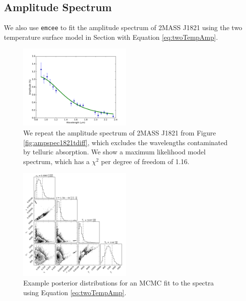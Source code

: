 \documentclass[twocolumn]{aastex6}
\begin{document}
\clearpage
\pagebreak
\subsection{Amplitude Spectrum}

We also use \texttt{emcee} to fit the amplitude spectrum of 2MASS J1821 using the two temperature surface model in Section \label{sec:spotModel} with Equation \ref{eq:twoTempAmp}.

\begin{figure}
\begin{centering}
\includegraphics[width=0.5\textwidth]{best_fit_spec_2temp.pdf}
\caption{We repeat the amplitude spectrum of 2MASS J1821 from Figure \ref{fig:ampspec1821tdiff}, which excludes the wavelengths contaminated by telluric absorption.
We show a maximum likelihood model spectrum, which has a $\chi^2$ per degree of freedom of 1.16.}\label{fig:ML2Tempfit}
\end{centering}
\end{figure}

\begin{figure}
\begin{centering}
\includegraphics[width=0.5\textwidth]{corner_fit_2temp.pdf}
\caption{Example posterior distributions for an MCMC fit to the spectra using Equation \ref{eq:twoTempAmp}.}\label{fig:post2Tempfit}
\end{centering}
\end{figure}
\end{document}

